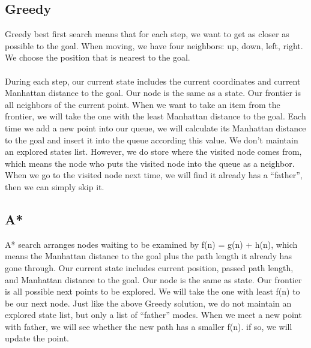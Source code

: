 \documentclass{mcmthesis}
\begin{document}
\subsection{Greedy}
Greedy best first search means that for each step, we want to get as closer as possible to the goal. When moving, we have four neighbors: up, down, left, right. We choose the position that is nearest to the goal.\\ 
\\
During each step, our current state includes the current coordinates and current Manhattan distance to the goal. Our node is the same as a state. Our frontier is all neighbors of the current point. When we want to take an item from the frontier, we will take the one with the least Manhattan distance to the goal. Each time we add a new point into our queue, we will calculate its Manhattan distance to the goal and insert it into the queue according this value. We don’t maintain an explored states list. However, we do store where the visited node comes from, which means the node who puts the visited node into the queue as a neighbor. When we go to the visited node next time, we will find it already has a “father”, then we can simply skip it.
\subsection{A*}
A* search arranges nodes waiting to be examined by f(n) = g(n) + h(n), which means the Manhattan distance to the goal plus the path length it already has gone through. Our current state includes current position, passed path length, and Manhattan distance to the goal. Our node is the same as state. Our frontier is all possible next points to be explored. We will take the one with least f(n) to be our next node. Just like the above Greedy solution, we do not maintain an explored state list, but only a list of “father” modes. When we meet a new point with father, we will see whether the new path has a smaller f(n). if so, we will update the point.
\pagebreak
\end{document}
